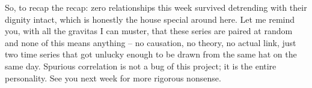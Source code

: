 So, to recap the recap: zero relationships this week survived detrending with their dignity intact, which is honestly the house special around here. Let me remind you, with all the gravitas I can muster, that these series are paired at random and none of this means anything -- no causation, no theory, no actual link, just two time series that got unlucky enough to be drawn from the same hat on the same day. Spurious correlation is not a bug of this project; it is the entire personality. See you next week for more rigorous nonsense.
